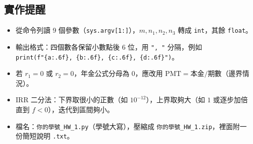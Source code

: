 \documentclass[11pt,a4paper]{article}
\begin{document}
\subsection{實作提醒}
\begin{itemize}[nosep]
  \item 從命令列讀 9 個參數（\texttt{sys.argv[1:]}），$m,n_1,n_2,n_3$ 轉成 \texttt{int}，其餘 \texttt{float}。
  \item 輸出格式：四個數各保留小數點後 6 位，用 \texttt{", "} 分隔，例如\\
        \texttt{print(f"\{a:.6f\}, \{b:.6f\}, \{c:.6f\}, \{d:.6f\}")}。
  \item 若 $r_1=0$ 或 $r_2=0$，年金公式分母為 0，應改用 $\mathrm{PMT}=\text{本金}/\text{期數}$（邊界情況）。
  \item IRR 二分法：下界取很小的正數（如 $10^{-12}$），上界取夠大（如 $1$ 或逐步加倍直到 $f<0$），迭代到區間夠小。
  \item 檔名：\texttt{你的學號\_HW\_1.py}（學號大寫），壓縮成 \texttt{你的學號\_HW\_1.zip}，裡面附一份簡短說明 \texttt{.txt}。
\end{itemize}
\end{document}
